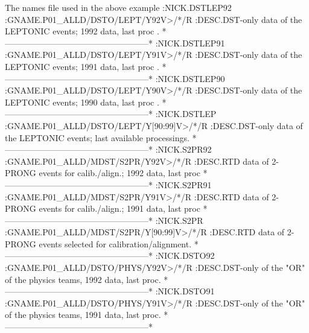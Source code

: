 \begin{XMPt}{The names file used in the above example}
:NICK.DSTLEP92                                                          
:GNAME.P01_ALLD/DSTO/LEPT/Y92V>/*/R                                     
:DESC.DST-only data of the LEPTONIC events; 1992 data, last proc .      
*---------------------------------------------------*                   
:NICK.DSTLEP91                                                          
:GNAME.P01_ALLD/DSTO/LEPT/Y91V>/*/R                                     
:DESC.DST-only data of the LEPTONIC events; 1991 data, last proc .      
*---------------------------------------------------*                   
:NICK.DSTLEP90                                                          
:GNAME.P01_ALLD/DSTO/LEPT/Y90V>/*/R                                     
:DESC.DST-only data of the LEPTONIC events; 1990 data, last proc .      
*---------------------------------------------------*                   
:NICK.DSTLEP                                                            
:GNAME.P01_ALLD/DSTO/LEPT/Y[90:99]V>/*/R                                
:DESC.DST-only data of the LEPTONIC events; last available processings. 
*---------------------------------------------------*                   
:NICK.S2PR92                                                            
:GNAME.P01_ALLD/MDST/S2PR/Y92V>/*/R                                     
:DESC.RTD data of 2-PRONG events for calib./align.; 1992 data, last proc
*---------------------------------------------------*                   
:NICK.S2PR91                                                            
:GNAME.P01_ALLD/MDST/S2PR/Y91V>/*/R                                     
:DESC.RTD data of 2-PRONG events for calib./align.; 1991 data, last proc
*---------------------------------------------------*                   
:NICK.S2PR                                                              
:GNAME.P01_ALLD/MDST/S2PR/Y[90:99]V>/*/R                                
:DESC.RTD data of 2-PRONG events selected for calibration/alignment.    
*---------------------------------------------------*                   
:NICK.DSTO92                                                            
:GNAME.P01_ALLD/DSTO/PHYS/Y92V>/*/R                                     
:DESC.DST-only of the "OR" of the physics teams, 1992 data, last proc.  
*---------------------------------------------------*                   
:NICK.DSTO91                                                            
:GNAME.P01_ALLD/DSTO/PHYS/Y91V>/*/R                                     
:DESC.DST-only of the "OR" of the physics teams, 1991 data, last proc.  
*---------------------------------------------------*                   

\end{XMPt}
